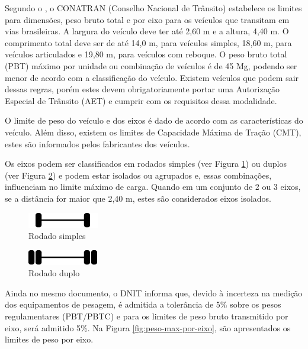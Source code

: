\documentclass{ufscThesis}
\begin{document}
Segundo o , o CONATRAN (Conselho Nacional de Trânsito) estabelece os limites para dimensões, peso bruto total e por eixo para os veículos que transitam em vias brasileiras. A largura do veículo deve ter até 2,60 m e a altura, 4,40 m. O comprimento total deve ser de até 14,0 m, para veículos simples, 18,60 m, para veículos articulados e 19,80 m, para veículos com reboque. O peso bruto total (PBT) máximo por unidade ou combinação de veículos é de 45 Mg, podendo ser menor de acordo com a classificação do veículo. Existem veículos que podem sair dessas regras, porém estes devem obrigatoriamente portar uma Autorização Especial de Trânsito (AET) e cumprir com os requisitos dessa modalidade.

O limite de peso do veículo e dos eixos é dado de acordo com as características do veículo. Além disso, existem os limites de Capacidade Máxima de Tração (CMT), estes são informados pelos fabricantes dos veículos. 

Os eixos podem ser classificados em rodados simples (ver Figura \ref{fig:rodado-simples}) ou duplos (ver Figura \ref{fig:rodado-duplo}) e podem estar isolados ou agrupados e, essas combinações, influenciam no limite máximo de carga. Quando em um conjunto de 2 ou 3 eixos, se a distância for maior que 2,40 m, estes são considerados eixos isolados.

\begin{figure}[h!]
  \caption{Rodado simples}
  \label{fig:rodado-simples}
  \centering
    \includegraphics[scale=1]{./figuras/ejes_simples2.jpg}
\end{figure}


\begin{figure}[h!]
  \caption{Rodado duplo}
  \label{fig:rodado-duplo}
  \centering
    \includegraphics[scale=1]{./figuras/ejes_simples1.jpg}
\end{figure}

Ainda no mesmo documento, o DNIT informa que, devido à incerteza na medição dos equipamentos de pesagem, é admitida a tolerância de 5\% sobre os pesos regulamentares (PBT/PBTC) e para os limites de peso bruto transmitido por eixo, será admitido 5\%. Na Figura \ref{fig:peso-max-por-eixo}, são apresentados os limites de peso por eixo.
\end{document}

